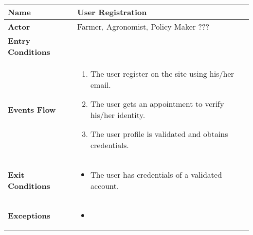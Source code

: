 \begin{center}
\renewcommand{\arraystretch}{1.25}
\begin{tabular}{|l|>{\raggedright\arraybackslash}m{12cm}|}
    \hline
    \textbf{Name} & User Registration\\
    \hline
   	\textbf{Actor} & Farmer, Agronomist, Policy Maker ???\\
    \hline
    \textbf{Entry Conditions} & \\
    \hline
    
    \textbf{Events Flow} & \begin{enumerate}
    			\item The user register on the site using his/her email.
    			\item The user gets an appointment to verify his/her identity.
    			\item The user profile is validated and obtains credentials.
	    		\end{enumerate}
    	\\
    \hline
    \textbf{Exit Conditions} & \begin{itemize}
    	\item The user has credentials of a validated account.
   		\end{itemize} \\
    \hline
    \textbf{Exceptions} &
    		\begin{itemize}
    			\item 
    		\end{itemize}
    \\
    \hline
\end{tabular}
\end{center}